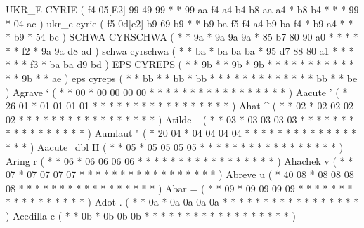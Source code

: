 \makeCOD UKR_E        CYRIE             ( f4 05[E2]  99 49  99 *  *  99    aa f4 a4 b4 b8    aa a4 *  b8    b4 *  *     *   99 *    04 ac  )
\makecod ukr_e        cyrie             ( f5 0d[e2]  b9 69  b9 *  *  b9    ba f5 f4 a4 b9    ba f4 *  b9    a4 *  *     *   b9 *    54 bc  )
\makeCOD SCHWA        CYRSCHWA          ( *  *       9a *   9a 9a 9a *     85 b7 80 90 a0    *  *  *  *     *  *  f2    *   9a 9a   d8 ad  )
\makecod schwa        cyrschwa          ( *  *       ba *   ba ba ba *     95 d7 88 80 a1    *  *  *  *     *  *  f3    *   ba ba   d9 bd  )
\makeCOD EPS          CYREPS            ( *  *       9b *   *  9b *  9b    *  *  *  *  *     *  *  *  *     *  *  *     *   9b *    *  ae  )
\makecod eps          cyreps            ( *  *       bb *   *  bb *  bb    *  *  *  *  *     *  *  *  *     *  *  *     *   bb *    *  be  )
%
\makeacc Agrave       `                 ( *  *       00 *   00 00 00 00    *  *  *  *  *     *  *  *  *     *  *  *     *   *  *    *  *   )
\makeacc Aacute       '                 ( *  26      01 *   01 01 01 01    *  *  *  *  *     *  *  *  *     *  *  *     *   *  *    *  *   )
\makeacc Ahat         ^                 ( *  *       02 *   02 02 02 02    *  *  *  *  *     *  *  *  *     *  *  *     *   *  *    *  *   )
\makeacc Atilde       ~                 ( *  *       03 *   03 03 03 03    *  *  *  *  *     *  *  *  *     *  *  *     *   *  *    *  *   )
\makeacc Aumlaut      "                 ( *  20      04 *   04 04 04 04    *  *  *  *  *     *  *  *  *     *  *  *     *   *  *    *  *   )
\makeacc Aacute_dbl   H                 ( *  *       05 *   05 05 05 05    *  *  *  *  *     *  *  *  *     *  *  *     *   *  *    *  *   )
\makeacc Aring        r                 ( *  *       06 *   06 06 06 06    *  *  *  *  *     *  *  *  *     *  *  *     *   *  *    *  *   )
\makeacc Ahachek      v                 ( *  *       07 *   07 07 07 07    *  *  *  *  *     *  *  *  *     *  *  *     *   *  *    *  *   )
\makeacc Abreve       u                 ( *  40      08 *   08 08 08 08    *  *  *  *  *     *  *  *  *     *  *  *     *   *  *    *  *   )
\makeacc Abar         =                 ( *  *       09 *   09 09 09 09    *  *  *  *  *     *  *  *  *     *  *  *     *   *  *    *  *   )
\makeacc Adot         .                 ( *  *       0a *   0a 0a 0a 0a    *  *  *  *  *     *  *  *  *     *  *  *     *   *  *    *  *   )
\makechr Acedilla     c                 ( *  *       0b *   0b 0b 0b *     *  *  *  *  *     *  *  *  *     *  *  *     *   *  *    *  *   )
